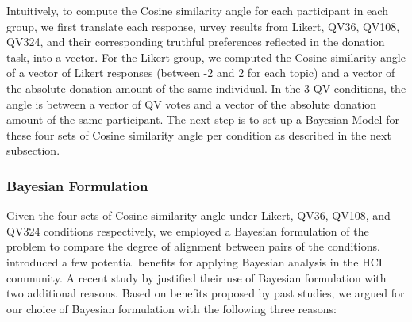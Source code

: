 Intuitively,
to compute the Cosine similarity angle 
for each participant in each group,
we first translate each response,
urvey results from Likert, QV36, QV108, QV324, and 
their corresponding truthful preferences 
reflected in the donation task,
into a vector.
For the Likert group, 
we computed the Cosine similarity angle of a vector 
of Likert responses (between -2 and 2 for each topic) and 
a vector of the absolute donation amount of the same individual. 
In the 3 QV conditions, 
the angle is between a vector of QV votes and 
a vector of the absolute donation amount of the same participant. 
The next step is to set up a Bayesian Model 
for these four sets of Cosine similarity angle 
per condition as described in the next subsection.


\subsubsection{Bayesian Formulation}

Given the four sets of Cosine similarity angle 
under Likert, QV36, QV108, and QV324 conditions respectively, 
we employed a Bayesian formulation of the problem 
to compare the degree of alignment between pairs of the conditions. 
\textcite{kay2016researcher} introduced a few potential benefits 
for applying Bayesian analysis in the HCI community. 
A recent study by \textcite{xiao2019should} 
justified their use of Bayesian formulation 
with two additional reasons. 
Based on benefits proposed by past studies, 
we argued for our choice of Bayesian formulation 
with the following three reasons:

